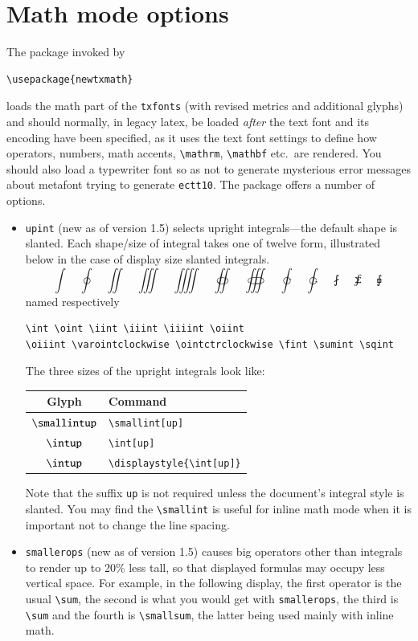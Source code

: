 \documentclass[\fsc]{article}
\theoremstyle{oldplain}
\theoremstyle{plain}
\begin{document}
\section{Math mode options}
The package invoked by
\begin{verbatim}
\usepackage{newtxmath}
\end{verbatim}
loads the math part of the {\tt txfonts} (with revised metrics and additional glyphs) and should normally, in legacy latex, be loaded \emph{after} the text font and its encoding have been specified, as it uses the text font settings to define how operators, numbers, math accents, \verb|\mathrm|, \verb|\mathbf| etc.\ are rendered. You should also load a typewriter font so as not to generate mysterious error messages about \textsf{metafont} trying to generate \texttt{ectt10}. The package offers a number of options.
\begin{itemize}
\item {\tt upint} (new as of version 1.5) selects upright integrals---the default shape is slanted. Each shape/size of integral takes one of twelve form, illustrated below in the case of display size slanted integrals.
\[\int\quad\oint\quad\iint\quad\iiint\quad\iiiint\quad\oiint\quad\oiiint\quad\varointclockwise\quad\ointctrclockwise\quad\fint\quad\sumint\quad\sqint\]
named respectively
\begin{verbatim}
\int \oint \iint \iiint \iiiint \oiint 
\oiiint \varointclockwise \ointctrclockwise \fint \sumint \sqint
\end{verbatim}
The three sizes of the upright integrals look like:
\begin{center}
  \begin{tabular}{@{} cl @{}}
    \hline
    Glyph & Command\\ 
    \hline
    $\smallintup$ & \verb|\smallint[up]|\\ 
    $\intup$ & \verb|\int[up]|  \\ 
    $\displaystyle{\intup}$ & \verb|\displaystyle{\int[up]}|\\ 
    \hline
  \end{tabular}
\end{center}
Note that the suffix {\tt up} is not required unless the document's integral style is slanted. You may find the \verb|\smallint| is useful for inline math mode when it is important not to change the line spacing.
\item {\tt smallerops} (new as of version 1.5) causes big operators other than integrals to render up to 20\% less tall, so that displayed formulas may occupy less vertical space. For example, in the following display, the first operator is the usual \verb|\sum|, the second is what you would get with {\tt smallerops}, the third is \verb|\sum| and the fourth is \verb|\smallsum|, the latter being used mainly with inline math. 

\end{itemize}
\end{document}
